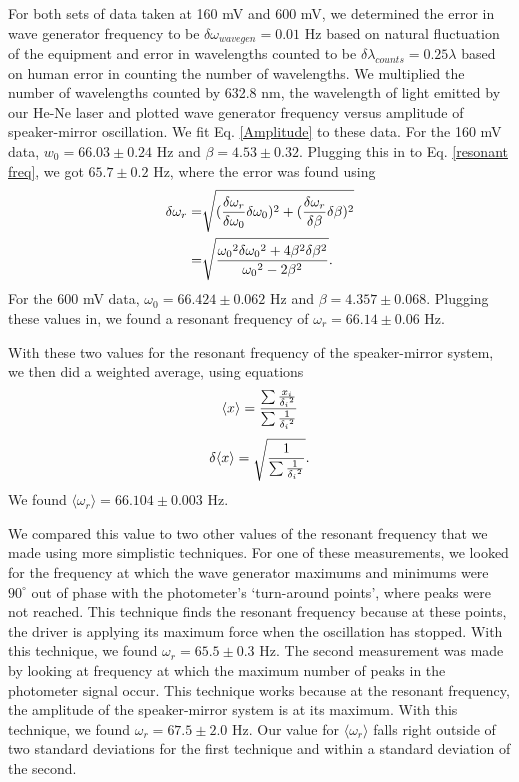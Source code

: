 \documentclass[11pt,letterpaper]{article}
\begin{document}
For both sets of data taken at 160 mV and 600 mV, we determined the error in wave generator frequency to be $\delta \omega _{wavegen} = 0.01$ Hz based on natural fluctuation of the equipment and error in wavelengths counted to be $\delta \lambda _{counts} = 0.25 \lambda$ based on human error in counting the number of wavelengths. We multiplied the number of wavelengths counted by 632.8 nm, the wavelength of light emitted by our He-Ne laser and plotted wave generator frequency versus amplitude of speaker-mirror oscillation. We fit Eq. \eqref{Amplitude} to these data. For the 160 mV data, $w_0 = 66.03 \pm 0.24$ Hz and $\beta = 4.53 \pm 0.32$. Plugging this in to Eq. \eqref{resonant freq}, we got $65.7 \pm 0.2$ Hz, where the error was found using
\begin{align}
    \delta \omega _r = & \sqrt{ ({\delta \omega _r \over \delta \omega _0} \delta \omega _0 ) ^2 + ({\delta \omega _r \over \delta \beta} \delta \beta )^2} \\
    = & \sqrt{ {{\omega _0}^2 \delta {\omega _0}^2 + 4 \beta ^2 \delta \beta ^2 \over {\omega _0}^2 - 2 \beta ^2}} .
\end{align}
For the 600 mV data, $\omega_0 = 66.424 \pm 0.062$ Hz and $\beta = 4.357 \pm 0.068$. Plugging these values in, we found a resonant frequency of $\omega _r = 66.14 \pm 0.06$ Hz. 

With these two values for the resonant frequency of the speaker-mirror system, we then did a weighted average, using equations
\begin{equation}
    \langle x \rangle = {\sum {x_i \over {\delta_i}^2} \over \sum {1 \over {\delta_i}^2}} 
\end{equation}
\begin{equation}
    \delta \langle x \rangle = \sqrt{{1 \over \sum {1 \over {\delta_i}^2}}} .
\end{equation}
We found $\langle \omega _r \rangle = 66.104 \pm 0.003$ Hz.

We compared this value to two other values of the resonant frequency that we made using more simplistic techniques. For one of these measurements, we looked for the frequency at which the wave generator maximums and minimums were $90^{\circ}$ out of phase with the photometer's `turn-around points', where peaks were not reached. This technique finds the resonant frequency because at these points, the driver is applying its maximum force when the oscillation has stopped. With this technique, we found $\omega _r = 65.5 \pm 0.3$ Hz. The second measurement was made by looking at frequency at which the maximum number of peaks in the photometer signal occur. This technique works because at the resonant frequency, the amplitude of the speaker-mirror system is at its maximum. With this technique, we found $\omega _r = 67.5 \pm 2.0$ Hz. Our value for $\langle \omega _r \rangle$ falls right outside of two standard deviations for the first technique and within a standard deviation of the second.
\end{document}
